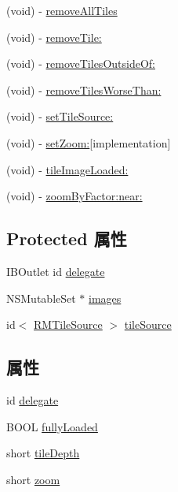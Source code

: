 \begin{DoxyCompactItemize}
(void) -\/ \hyperlink{interface_r_m_tile_image_set_a9179d8ff503e517d74c9f68422d0af08}{remove\-All\-Tiles}
\item 
(void) -\/ \hyperlink{interface_r_m_tile_image_set_a9b005f72f25974d89326a2850dfd1671}{remove\-Tile\-:}
\item 
(void) -\/ \hyperlink{interface_r_m_tile_image_set_a9ce181a61a0633fedad6438d51c98622}{remove\-Tiles\-Outside\-Of\-:}
\item 
(void) -\/ \hyperlink{interface_r_m_tile_image_set_a030f2f2e323b327e1eee9503638c3de1}{remove\-Tiles\-Worse\-Than\-:}
\item 
(void) -\/ \hyperlink{interface_r_m_tile_image_set_aa68456081735c68063ae9ba077a1c4b0}{set\-Tile\-Source\-:}
\item 
(void) -\/ \hyperlink{interface_r_m_tile_image_set_a01ccfb26cfc02dd741729d7147ea4525}{set\-Zoom\-:}{\ttfamily  \mbox{[}implementation\mbox{]}}
\item 
(void) -\/ \hyperlink{interface_r_m_tile_image_set_a8e6ec0436f6c88d7da0fa965c8603e2f}{tile\-Image\-Loaded\-:}
\item 
(void) -\/ \hyperlink{interface_r_m_tile_image_set_a6d4a7b5e2b2c267a2e17a667f3814c9b}{zoom\-By\-Factor\-:near\-:}
\end{DoxyCompactItemize}
\subsection*{Protected 属性}
\begin{DoxyCompactItemize}
\item 
I\-B\-Outlet id \hyperlink{interface_r_m_tile_image_set_a9c70ab2e2d4366bd9e8dc7f5eebf7333}{delegate}
\item 
N\-S\-Mutable\-Set $\ast$ \hyperlink{interface_r_m_tile_image_set_a0ce4a1ac5b6c436d625de6066b5b2d97}{images}
\item 
id$<$ \hyperlink{protocol_r_m_tile_source-p}{R\-M\-Tile\-Source} $>$ \hyperlink{interface_r_m_tile_image_set_a2ec72937c3da5ee7f70a2aa1a3590f8b}{tile\-Source}
\end{DoxyCompactItemize}
\subsection*{属性}
\begin{DoxyCompactItemize}
\item 
id \hyperlink{interface_r_m_tile_image_set_ae947fac72e535f6ba3288a1a3d0eddd3}{delegate}
\item 
B\-O\-O\-L \hyperlink{interface_r_m_tile_image_set_a9b5c09c58a3afb2dab367be213d88603}{fully\-Loaded}
\item 
short \hyperlink{interface_r_m_tile_image_set_aa0e24e61acf64b8014c293dcb6326204}{tile\-Depth}
\item 
short \hyperlink{interface_r_m_tile_image_set_a87c4fd7a829461f1de0b9a7dce4f68ad}{zoom}
\end{DoxyCompactItemize}


